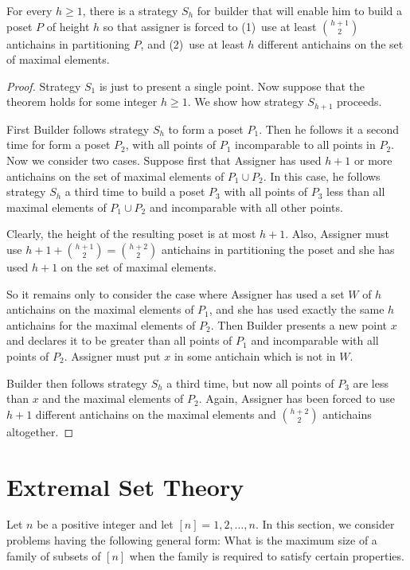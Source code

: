 \begin{theorem} 
For every $h\ge1$, there is a strategy $S_h$ for builder
that will enable him to build a poset $P$ of height $h$ so
that assigner is forced to (1)~use at least $\binom{h+1}{2}$
antichains in partitioning $P$, and (2)~use at least $h$
different antichains on the set of maximal elements.
\end{theorem}

\begin{proof}
Strategy $S_1$ is just to present a single point.
Now suppose that the theorem holds for some integer $h\ge1$.
We show how strategy $S_{h+1}$ proceeds.

First Builder follows strategy $S_h$ to form a poset $P_1$.
Then he follows it a second time for form a poset $P_2$, with
all points of $P_1$ incomparable to all points in $P_2$.
Now we consider two cases.  Suppose first that Assigner
has used $h+1$ or more antichains on the set of maximal elements of
$P_1\cup P_2$.  In this case, he follows strategy $S_h$
a third time to build a poset $P_3$ with all points of
$P_3$ less than all maximal elements of $P_1\cup P_2$
and incomparable with all other points.

Clearly, the height of the resulting poset is at most $h+1$.
Also, Assigner must use $h+1+\binom{h+1}{2}=\binom{h+2}{2}$
antichains in partitioning the poset and she has used $h+1$ on
the set of maximal elements.

So it remains only to consider the case where Assigner has used
a set $W$ of $h$ antichains on the maximal elements of $P_1$, and
she has used exactly the same $h$ antichains for the maximal elements
of $P_2$.  Then Builder presents a new point $x$
and declares it to be greater than all points of $P_1$ and
incomparable with all points of $P_2$.  Assigner must put $x$
in some antichain which is not in $W$.

Builder then follows strategy $S_h$ a third time, but
now all points of $P_3$ are less than $x$ and the maximal elements
of $P_2$.   Again, Assigner has been forced to use $h+1$ different
antichains on the maximal elements and $\binom{h+2}{2}$
antichains altogether.
\end{proof}

\section{Extremal Set Theory}

Let $n$ be a positive integer and let $[n]=1,2,\dots,n$.  In this
section, we consider problems having the following general form:
What is the maximum size of a family of subsets of $[n]$ when the
family is required to satisfy certain properties.

